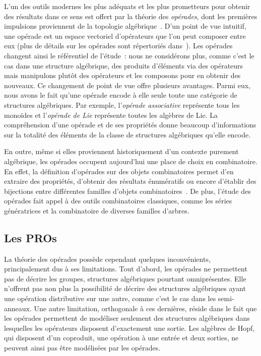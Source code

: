 \documentclass[10pt,reqno]{amsart}
\numberwithin{equation}{subsection}
\begin{document}
L'un des outils modernes les plus adéquats et les plus prometteurs pour
obtenir des résultats dans ce sens est offert par la théorie des
{\em opérades}, dont les premières impulsions proviennent de la
topologie algébrique~\cite{May72}. D'un point de vue intuitif, une opérade
est un espace vectoriel d'opérateurs que l'on peut composer entre eux
(plus de détails sur les opérades sont répertoriés dans~\cite{Mar08,LV12}).
Les opérades changent ainsi le référentiel de l'étude~: nous ne considérons
plus, comme c'est le cas dans une structure algébrique, des produits
d'éléments via des opérateurs mais manipulons plutôt des opérateurs et
les composons pour en obtenir des nouveaux. Ce changement de point de
vue offre plusieurs avantages. Parmi eux, nous avons le fait qu'une
opérade encode à elle seule toute une catégorie de structures algébriques.
Par exemple, l'{\em opérade associative} représente tous les monoïdes et
l'{\em opérade de Lie} représente toutes les algèbres de Lie. La
compréhension d'une opérade et de ses propriétés donne beaucoup
d'informations sur la totalité des éléments de la classe de structures
algébriques qu'elle encode.

En outre, même si elles proviennent historiquement d'un contexte purement
algébrique, les opérades occupent aujourd'hui une place de choix en
combinatoire. En effet, la définition d'opérades sur des objets
combinatoires permet d'en extraire des propriétés, d'obtenir des
résultats énumératifs ou encore d'établir des bijections entre différentes
familles d'objets combinatoires~\cite{Cha08,CG14,Gir15}. De plus, l'étude
des opérades fait appel à des outils combinatoires classiques, comme les
séries génératrices et la combinatoire de diverses familles d'arbres.

\subsection{Les PROs}
La théorie des opérades possède cependant quelques inconvénients,
principalement dus à ses limitations. Tout d'abord, les opérades ne
permettent pas de décrire les groupes, structures algébriques pourtant
omniprésentes. Elle n'offrent pas non plus la possibilité de décrire des
structures algébriques ayant une opération distributive sur une autre,
comme c'est le cas dans les semi-anneaux. Une autre limitation, orthogonale
à ces dernières, réside dans le fait que les opérades permettent de
modéliser seulement des structures algébriques dans lesquelles les
opérateurs disposent d'exactement une sortie. Les algèbres de Hopf, qui
disposent d'un coproduit, une opération à une entrée et deux sorties, ne
peuvent ainsi pas être modélisées par les opérades.
\end{document}
